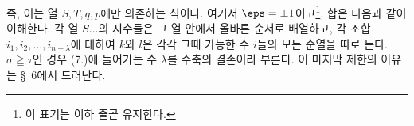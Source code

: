 \endgroup
즉, 이는 열 $S,T,q,p$에만 의존하는 식이다. 여기서 $\eps=\pm1$이고\footnote{이 표기는 이하 줄곧 유지한다.}, 합은 다음과 같이 이해한다. 각 열 $S\ldots$의 지수들은 그 열 안에서 올바른 순서로 배열하고, 각 조합 $i_1,i_2,\ldots,i_{n-\lambda}$에 대하여 $k$와 $l$은 각각 그때 가능한 수 $i$들의 모든 순열을 따로 돈다. $\sigma\geqq\tau$인 경우 (7.)에 들어가는 수 $\lambda$를 수축의 결손이라 부른다. 이 마지막 제한의 이유는 \S\ 6에서 드러난다.
